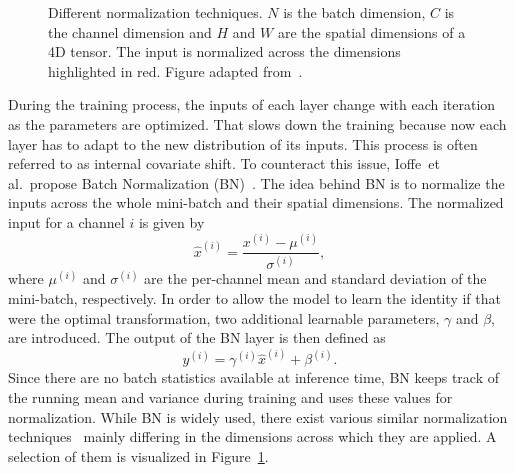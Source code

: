 \begin{figure}
    \hfill

    \caption{
        Different normalization techniques. $N$ is the batch dimension, $C$ is the channel dimension and $H$ and $W$ are
        the spatial dimensions of a 4D tensor. The input is normalized across the dimensions highlighted in red.
        Figure adapted from~\cite{GroupNorm}.
    }\label{fig:normalization}
\end{figure}

During the training process, the inputs of each layer change with each iteration as the parameters are optimized.
That slows down the training because now each layer has to adapt to the new distribution of its inputs. This process is often referred to as internal covariate shift.
To counteract this issue, Ioffe~et al.\ propose Batch Normalization (BN)~\cite{BatchNorm}.
The idea behind BN is to normalize the inputs across the whole mini-batch and their spatial dimensions.
The normalized input for a channel $i$ is given by
\begin{equation}
    \hat{x}^{(i)} = \frac{x^{(i)} - \mu^{(i)}}{\sigma^{(i)}},
\end{equation} 
where $\mu^{(i)}$ and $\sigma^{(i)}$ are the per-channel mean and standard deviation of the mini-batch, respectively.  
In order to allow the model to learn the identity if that were the optimal transformation, two additional learnable parameters, $\gamma$ and $\beta$, are introduced. The output of the BN layer is then defined as
\begin{equation}
    y^{(i)} = \gamma^{(i)}\hat{x}^{(i)} + \beta^{(i)}.
\end{equation}
Since there are no batch statistics available at inference time, BN keeps track of the running mean and variance during training and uses these values for normalization.
While BN is widely used, there exist various similar normalization techniques~\cite{LayerNorm, InstanceNorm, GroupNorm} mainly differing in the dimensions across which they are applied.
A selection of them is visualized in Figure~\ref{fig:normalization}.


